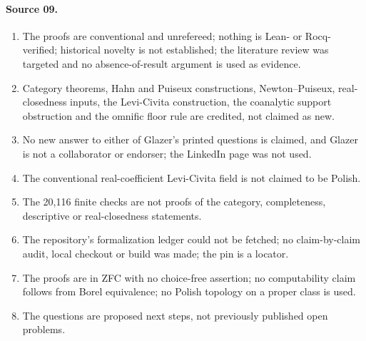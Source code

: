 \documentclass[11pt]{article}
\numberwithin{equation}{section}
\theoremstyle{definition}
\theoremstyle{remark}
\begin{document}
\paragraph{Source 09.}
\begin{enumerate}[label=09.\arabic*]
\item The proofs are conventional and unrefereed; nothing is Lean- or
Rocq-verified; historical novelty is not established; the literature review
was targeted and no absence-of-result argument is used as evidence.
\item Category theorems, Hahn and Puiseux constructions, Newton--Puiseux,
real-closedness inputs, the Levi-Civita construction, the coanalytic support
obstruction and the omnific floor rule are credited, not claimed as new.
\item No new answer to either of Glazer's printed questions is claimed, and
Glazer is not a collaborator or endorser; the LinkedIn page was not used.
\item The conventional real-coefficient Levi-Civita field is not claimed to be
Polish.
\item The 20{,}116 finite checks are not proofs of the category, completeness,
descriptive or real-closedness statements.
\item The repository's formalization ledger could not be fetched; no
claim-by-claim audit, local checkout or build was made; the pin is a locator.
\item The proofs are in ZFC with no choice-free assertion; no computability
claim follows from Borel equivalence; no Polish topology on a proper class is
used.
\item The questions are proposed next steps, not previously published open
problems.
\end{enumerate}
\end{document}
